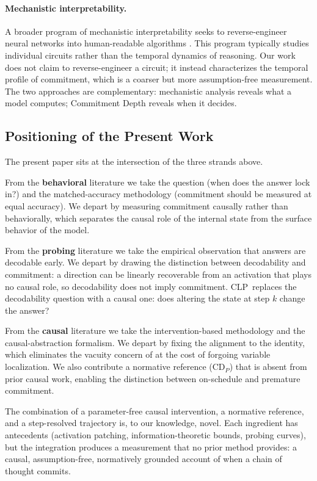 \documentclass[11pt]{article}
\newcommand{\CDP}{\mathrm{CD}_{P}}
\newcommand{\stepk}{k}
\newcommand{\CLP}{\textsc{CLP}}
\begin{document}
\paragraph{Mechanistic interpretability.}
A broader program of mechanistic interpretability seeks to reverse-engineer
neural networks into human-readable algorithms
\citep{olah2020zoom,elhage2021mathematical,templeton2024scaling}. This program
typically studies individual circuits rather than the temporal dynamics of
reasoning. Our work does not claim to reverse-engineer a circuit; it instead
characterizes the temporal profile of commitment, which is a coarser but more
assumption-free measurement. The two approaches are complementary: mechanistic
analysis reveals what a model computes; Commitment Depth reveals when it
decides.

\subsection{Positioning of the Present Work}
\label{app:related-positioning}

The present paper sits at the intersection of the three strands above.

From the \textbf{behavioral} literature we take the question (when does the
answer lock in?) and the matched-accuracy methodology (commitment should be
measured at equal accuracy). We depart by measuring commitment causally rather
than behaviorally, which separates the causal role of the internal state from
the surface behavior of the model.

From the \textbf{probing} literature we take the empirical observation that
answers are decodable early. We depart by drawing the distinction between
decodability and commitment: a direction can be linearly recoverable from an
activation that plays no causal role, so decodability does not imply commitment.
\CLP\ replaces the decodability question with a causal one: does altering the
state at step $\stepk$ change the answer?

From the \textbf{causal} literature we take the intervention-based methodology
and the causal-abstraction formalism. We depart by fixing the alignment to the
identity, which eliminates the vacuity concern of \citet{sutter2025nonlinear}
at the cost of forgoing variable localization. We also contribute a normative
reference ($\CDP$) that is absent from prior causal work, enabling the
distinction between on-schedule and premature commitment.

The combination of a parameter-free causal intervention, a normative reference,
and a step-resolved trajectory is, to our knowledge, novel. Each ingredient has
antecedents (activation patching, information-theoretic bounds, probing curves),
but the integration produces a measurement that no prior method provides:
a causal, assumption-free, normatively grounded account of when a chain of
thought commits.
\end{document}
